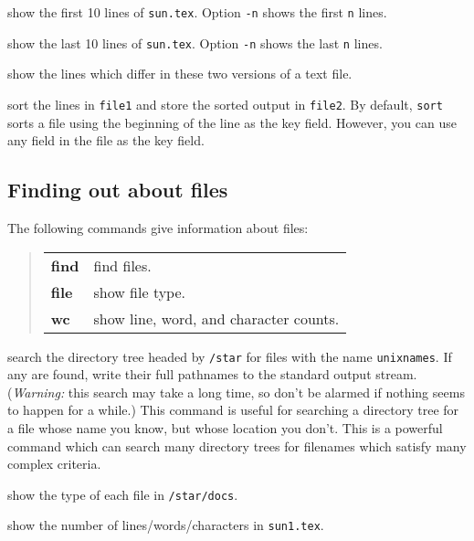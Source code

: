 {show the first 10 lines of {\tt sun.tex}.
Option {\tt -n} shows the first {\tt n} lines.}

{show the last 10 lines of {\tt sun.tex}.
Option {\tt -n} shows the last {\tt n} lines.}

{show the lines which differ in these two versions of a text file.}

{sort the lines in {\tt file1} and store the sorted output in {\tt file2}.
By default, {\tt sort} sorts a file using the beginning of the line as the
key field.
However, you can use any field in the file as the key field.}

\exend

\subsection{Finding out about files}

The following commands give information about files:

\begin{quote}
\begin{tabular}{lp{67mm}}

{\bf find} & find files.\\
{\bf file} & show file type.\\
{\bf wc}   & show line, word, and character counts.

\end{tabular}
\end{quote}

\exbegin

{search the directory tree headed by {\tt /star} for files with the name
{\tt unixnames}.
If any are found, write their full pathnames to the standard output stream.
({\em Warning:}\/ this search may take a long time, so don't be alarmed if
nothing seems to happen for a while.)
This command is useful for searching a directory tree for a file whose
name you know, but whose location you don't.
This is a powerful command which can search many directory trees for filenames
which satisfy many complex criteria.}

{show the type of each file in {\tt /star/docs}.}

{\small show the number of lines/words/characters in {\tt sun1.tex}.}

\exend

